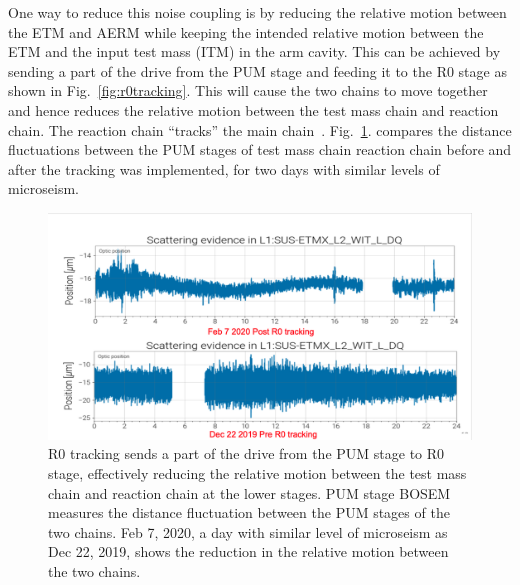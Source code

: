 \documentclass[12pt]{iopart}
\begin{document}
One way to reduce this noise coupling is by reducing the relative motion between the ETM and AERM while keeping the intended relative motion between the ETM and the input test mass (ITM) in the arm cavity. This can be achieved by sending a part of the drive from the PUM stage and feeding it to the R0 stage as shown in Fig.~\ref{fig:r0tracking}. This will cause the two chains to move together and hence reduces the relative motion between the test mass chain and reaction chain. The reaction chain ``tracks'' the main chain~\cite{alog_robert}. Fig.~\ref{fig:l2_comparison}. compares the distance fluctuations between the PUM stages of test mass chain reaction chain before and after the tracking was implemented, for two days with similar levels of microseism.

\begin{figure}[h]
    \centering
    \includegraphics[width=12cm]{feb7_dec22l2.png}
    \caption{R0 tracking sends a part of the drive from the PUM stage to R0 stage, effectively reducing the relative motion between the test mass chain and reaction chain at the lower stages. PUM stage BOSEM measures the distance fluctuation between the PUM stages of the two chains. Feb 7, 2020, a day with similar level of microseism as Dec 22, 2019, shows the  reduction in the relative motion between the two chains.}
    \label{fig:l2_comparison}
\end{figure}
\end{document}
